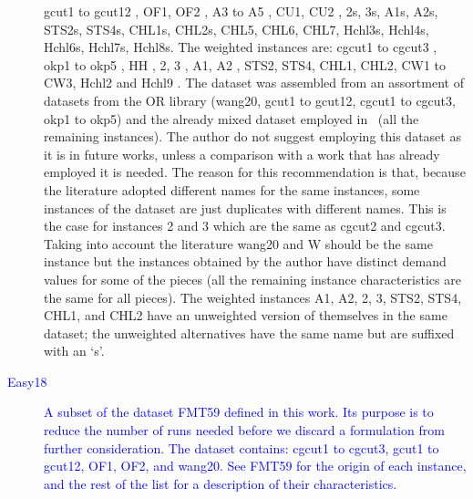 \documentclass[ppgc,tese,english,formais,babel]{iiufrgs}
\newif\iffinalversion
\newcommand{\newtext}[1]{\iffinalversion%
#1%
\else%
\textcolor{blue}{#1}%
\fi%
}
\begin{document}
\begin{description}
{gcut1 to gcut12 \citep{beasley:1985:guillotine},
OF1, OF2 \citep{oliveira:1990},
A3 to A5 \citep{hifi:1997},
CU1, CU2 \citep{fayard:1998},
2s, 3s, A1s, A2s, STS2s, STS4s, CHL1s, CHL2s, CHL5, CHL6, CHL7, Hchl3s, Hchl4s, Hchl6s, Hchl7s, Hchl8s\citep{cung:2000}.
The weighted instances are:
cgcut1 to cgcut3 \citep{cw:1977},
okp1 to okp5 \citep{fekete:1997},
HH \citep{hifi:1997},
2, 3 \citep{cw:1977},
A1, A2 \citep{hifi:1997},
STS2, STS4, CHL1, CHL2, CW1 to CW3, Hchl2 and Hchl9 \citep{cung:2000}.
The dataset was assembled from an assortment of datasets from the OR library (wang20, gcut1 to gcut12, cgcut1 to cgcut3, okp1 to okp5) and the already mixed dataset employed in~\citet{hifi:2001} (all the remaining instances).
The author do not suggest employing this dataset as it is in future works, unless a comparison with a work that has already employed it is needed.
The reason for this recommendation is that, because the literature adopted different names for the same instances, some instances of the dataset are just duplicates with different names.
This is the case for instances 2 and 3 which are the same as cgcut2 and cgcut3.
Taking into account the literature wang20 and W should be the same instance but the instances obtained by the author have distinct demand values for some of the pieces (all the remaining instance characteristics are the same for all pieces).
The weighted instances A1, A2, 2, 3, STS2, STS4, CHL1, and CHL2 have an unweighted version of themselves in the same dataset; the unweighted alternatives have the same name but are suffixed with an `s'.
}
\item [\newtext{Easy18}] \newtext{A subset of the dataset FMT59 defined in this work. Its purpose is to reduce the number of runs needed before we discard a formulation from further consideration. The dataset contains: cgcut1 to cgcut3, gcut1 to gcut12, OF1, OF2, and wang20. See FMT59 for the origin of each instance, and the rest of the list for a description of their characteristics.}
\end{description}
\end{document}
